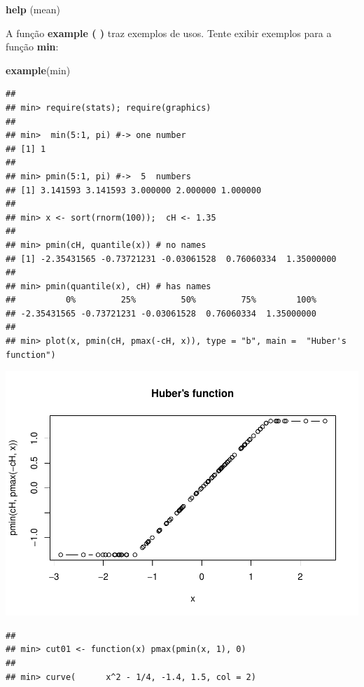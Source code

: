 \documentclass[]{book}
\newenvironment{Shaded}{\begin{snugshade}}{\end{snugshade}}
\newcommand{\KeywordTok}[1]{\textcolor[rgb]{0.13,0.29,0.53}{\textbf{#1}}}
\newcommand{\NormalTok}[1]{#1}
\begin{document}
\begin{Shaded}
\begin{Highlighting}[]
\KeywordTok{help}\NormalTok{ (mean)}
\end{Highlighting}
\end{Shaded}

A função \textbf{example ( )} traz exemplos de usos. Tente exibir exemplos para a função \textbf{min}:

\begin{Shaded}
\begin{Highlighting}[]
\KeywordTok{example}\NormalTok{(min)}
\end{Highlighting}
\end{Shaded}

\begin{verbatim}
## 
## min> require(stats); require(graphics)
## 
## min>  min(5:1, pi) #-> one number
## [1] 1
## 
## min> pmin(5:1, pi) #->  5  numbers
## [1] 3.141593 3.141593 3.000000 2.000000 1.000000
## 
## min> x <- sort(rnorm(100));  cH <- 1.35
## 
## min> pmin(cH, quantile(x)) # no names
## [1] -2.35431565 -0.73721231 -0.03061528  0.76060334  1.35000000
## 
## min> pmin(quantile(x), cH) # has names
##          0%         25%         50%         75%        100% 
## -2.35431565 -0.73721231 -0.03061528  0.76060334  1.35000000 
## 
## min> plot(x, pmin(cH, pmax(-cH, x)), type = "b", main =  "Huber's function")
\end{verbatim}

\includegraphics{TudodoR_files/figure-latex/unnamed-chunk-14-1.pdf}

\begin{verbatim}
## 
## min> cut01 <- function(x) pmax(pmin(x, 1), 0)
## 
## min> curve(      x^2 - 1/4, -1.4, 1.5, col = 2)
\end{verbatim}
\end{document}
